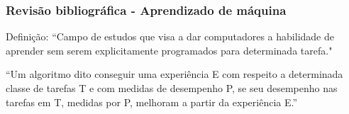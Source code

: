 \documentclass{beamer}
\begin{document}
\begin{frame}
    \frametitle{Revisão bibliográfica - Aprendizado de máquina}
    Definição:
    “Campo de estudos que visa a dar computadores a habilidade de aprender sem serem explicitamente programados para determinada tarefa." ~\cite{Samuel1959SomeSI}
    
    “Um algoritmo dito conseguir uma experiência E com respeito a determinada classe de tarefas T e com medidas de desempenho P, se seu desempenho nas tarefas em T, medidas por P, melhoram a partir da experiência E.” ~\cite{Mitchell97} 
    
    
    
    \end{frame}
\end{document}
